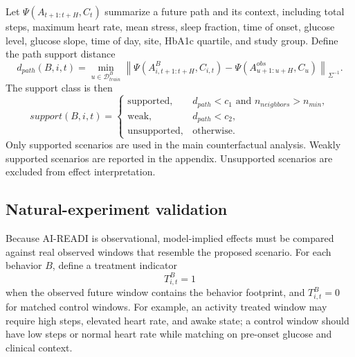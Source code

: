 Let $\Psi(A_{t+1:t+H},C_t)$ summarize a future path and its context, including total steps, maximum heart rate, mean stress, sleep fraction, time of onset, glucose level, glucose slope, time of day, site, HbA1c quartile, and study group. Define the path support distance
\begin{equation}
    d_{path}(B,i,t)
    =
    \min_{u\in\mathcal{D}^{B}_{train}}
    \left\|\Psi(A^{B}_{i,t+1:t+H},C_{i,t})
    - \Psi(A^{obs}_{u+1:u+H},C_u)\right\|_{\Sigma^{-1}}.
    \label{eq:path_support}
\end{equation}
The support class is then
\begin{equation}
    support(B,i,t)=
    \begin{cases}
        \mathrm{supported}, & d_{path}<c_1 \text{ and } n_{neighbors}>n_{min},\\
        \mathrm{weak}, & d_{path}<c_2,\\
        \mathrm{unsupported}, & \mathrm{otherwise}.
    \end{cases}
    \label{eq:support_class}
\end{equation}
Only supported scenarios are used in the main counterfactual analysis. Weakly supported scenarios are reported in the appendix. Unsupported scenarios are excluded from effect interpretation.

\subsection{Natural-experiment validation}
\label{subsec:natural_experiment_validation}

Because AI-READI is observational, model-implied effects must be compared against real observed windows that resemble the proposed scenario. For each behavior $B$, define a treatment indicator
\begin{equation}
    T^B_{i,t} = 1
\end{equation}
when the observed future window contains the behavior footprint, and $T^B_{i,t}=0$ for matched control windows. For example, an activity treated window may require high steps, elevated heart rate, and awake state; a control window should have low steps or normal heart rate while matching on pre-onset glucose and clinical context.

